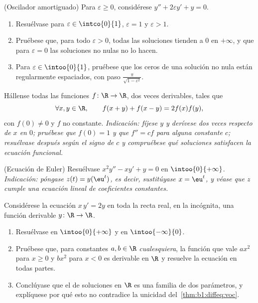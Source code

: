 \begin{exercise}[$\star\star\star$]\label{exo:b1:diffeq:9}
(Oscilador amortiguado) Para $\varepsilon \geq 0$, considérese
$y'' + 2\varepsilon y' + y = 0$.
\begin{enumerate}
  \item Resuélvase para $\varepsilon \in \intco{0}{1}$,
        $\varepsilon = 1$ y $\varepsilon > 1$.
  \item Pruébese que, para todo $\varepsilon > 0$, todas las
        soluciones tienden a $0$ en $+\infty$, y que para
        $\varepsilon = 0$ las soluciones no nulas no lo hacen.
  \item Para $\varepsilon \in \intoo{0}{1}$, pruébese que los ceros de
        una solución no nula están regularmente espaciados, con paso
        $\frac{\pi}{\sqrt{1 - \varepsilon^2}}$.
\end{enumerate}
\end{exercise}

\begin{exercise}[$\star\star\star$]\label{exo:b1:diffeq:10}
Hállense todas las funciones $f \colon \R \to \R$, dos veces
derivables, tales que
\[
\forall x, y \in \R, \qquad f(x + y) + f(x - y) = 2 f(x) f(y),
\]
con $f(0) \ne 0$ y $f$ no constante.
\emph{Indicación: fíjese $y$ y derívese dos veces respecto de $x$ en
$0$; pruébese que $f(0) = 1$ y que $f'' = c f$ para alguna constante
$c$; resuélvase después según el signo de $c$ y compruébese qué
soluciones satisfacen la ecuación funcional.}
\end{exercise}

\begin{exercise}[$\star\star$]\label{exo:b1:diffeq:11}
(Ecuación de Euler) Resuélvase $x^2 y'' - x y' + y = 0$ en
$\intoo{0}{+\infty}$. \emph{Indicación: póngase $z(t) = y(\eu^t)$, es
decir, sustitúyase $x = \eu^t$, y véase que $z$ cumple una ecuación
lineal de coeficientes constantes.}
\end{exercise}

\begin{exercise}[$\star\star\star$]\label{exo:b1:diffeq:12}
Considérese la ecuación $x\,y' = 2y$ en toda la recta real, en la
incógnita, una función derivable $y \colon \R \to \R$.
\begin{enumerate}
  \item Resuélvase en $\intoo{0}{+\infty}$ y en $\intoo{-\infty}{0}$.
  \item Pruébese que, para constantes $a, b \in \R$
        \emph{cualesquiera}, la función que vale $ax^2$ para $x \geq 0$
        y $bx^2$ para $x < 0$ es derivable en $\R$ y resuelve la
        ecuación en todas partes.
  \item Conclúyase que el  de soluciones en $\R$ es una
        familia de dos parámetros, y explíquese por qué esto no
        contradice la unicidad del~\cref{thm:b1:diffeq:voc}.
\end{enumerate}
\end{exercise}

